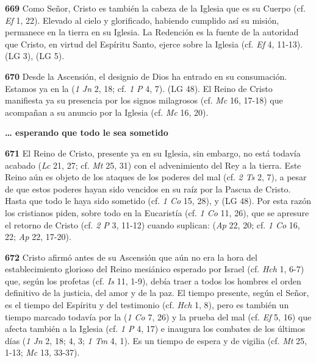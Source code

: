 \begin{body}
\textbf{669} Como Señor, Cristo es también la cabeza de la Iglesia que es su Cuerpo (cf. \emph{Ef} 1, 22). Elevado al cielo y glorificado, habiendo cumplido así su misión, permanece en la tierra en su Iglesia. La Redención es la fuente de la autoridad que Cristo, en virtud del Espíritu Santo, ejerce sobre la Iglesia (cf. \emph{Ef} 4, 11-13).  (LG 3),  (LG 5).

\textbf{670} Desde la Ascensión, el designio de Dios ha entrado en su consumación. Estamos ya en la  (\emph{1 Jn} 2, 18; cf. \emph{1 P} 4, 7).  (LG 48). El Reino de Cristo manifiesta ya su presencia por los signos milagrosos (cf. \emph{Mc} 16, 17-18) que acompañan a su anuncio por la Iglesia (cf. \emph{Mc} 16, 20).

\textbf{\ldots{} esperando que todo le sea sometido}

\textbf{671} El Reino de Cristo, presente ya en su Iglesia, sin embargo, no está todavía acabado  (\emph{Lc} 21, 27; cf. \emph{Mt} 25, 31) con el advenimiento del Rey a la tierra. Este Reino aún es objeto de los ataques de los poderes del mal (cf. \emph{2 Ts} 2, 7), a pesar de que estos poderes hayan sido vencidos en su raíz por la Pascua de Cristo. Hasta que todo le haya sido sometido (cf. \emph{1 Co} 15, 28), y  (LG 48). Por esta razón los cristianos piden, sobre todo en la Eucaristía (cf. \emph{1 Co} 11, 26), que se apresure el retorno de Cristo (cf. \emph{2 P} 3, 11-12) cuando suplican:  (\emph{Ap} 22, 20; cf. \emph{1 Co} 16, 22; \emph{Ap} 22, 17-20).



\textbf{672} Cristo afirmó antes de su Ascensión que aún no era la hora del establecimiento glorioso del Reino mesiánico esperado por Israel (cf. \emph{Hch} 1, 6-7) que, según los profetas (cf. \emph{Is} 11, 1-9), debía traer a todos los hombres el orden definitivo de la justicia, del amor y de la paz. El tiempo presente, según el Señor, es el tiempo del Espíritu y del testimonio (cf. \emph{Hch} 1, 8), pero es también un tiempo marcado todavía por la  (\emph{1 Co} 7, 26) y la prueba del mal (cf. \emph{Ef} 5, 16) que afecta también a la Iglesia (cf. \emph{1 P} 4, 17) e inaugura los combates de los últimos días (\emph{1 Jn} 2, 18; 4, 3; \emph{1 Tm} 4, 1). Es un tiempo de espera y de vigilia (cf. \emph{Mt} 25, 1-13; \emph{Mc} 13, 33-37).


\end{body}
